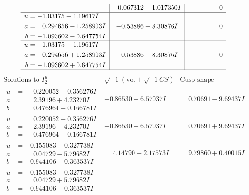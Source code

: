 \documentclass[1p]{elsarticle_modified}
\theoremstyle{definition}
\newcommand{\I}{\sqrt{-1}}
\begin{document}
$$\begin{array}{c|c|c}
 & \phantom{-}0.067312 - 1.017350 I & \phantom{-0.000000 } 0 \\ \hline\begin{aligned}
u &= -1.03175 + 1.19617 I \\
a &= \phantom{-}0.294656 - 1.258903 I \\
b &= -1.093602 - 0.647754 I\end{aligned}
 & -0.53886 + 8.30876 I & \phantom{-0.000000 } 0 \\ \hline\begin{aligned}
u &= -1.03175 - 1.19617 I \\
a &= \phantom{-}0.294656 + 1.258903 I \\
b &= -1.093602 + 0.647754 I\end{aligned}
 & -0.53886 - 8.30876 I & \phantom{-0.000000 } 0\\
 \hline 
 \end{array}$$\newpage$$\begin{array}{c|c|c}  
\text{Solutions to }I^u_{2}& \I (\text{vol} + \sqrt{-1}CS) & \text{Cusp shape}\\
 \hline 
\begin{aligned}
u &= \phantom{-}0.220052 + 0.356276 I \\
a &= \phantom{-}2.39196 + 4.23270 I \\
b &= \phantom{-}0.476964 - 0.166781 I\end{aligned}
 & -0.86530 + 6.57037 I & \phantom{-}0.70691 - 9.69437 I \\ \hline\begin{aligned}
u &= \phantom{-}0.220052 - 0.356276 I \\
a &= \phantom{-}2.39196 - 4.23270 I \\
b &= \phantom{-}0.476964 + 0.166781 I\end{aligned}
 & -0.86530 - 6.57037 I & \phantom{-}0.70691 + 9.69437 I \\ \hline\begin{aligned}
u &= -0.155083 + 0.327738 I \\
a &= \phantom{-}0.04729 - 5.79682 I \\
b &= -0.944106 - 0.363537 I\end{aligned}
 & \phantom{-}4.14790 - 2.17573 I & \phantom{-}9.79860 + 0.40015 I \\ \hline\begin{aligned}
u &= -0.155083 - 0.327738 I \\
a &= \phantom{-}0.04729 + 5.79682 I \\
b &= -0.944106 + 0.363537 I\end{aligned}

\end{array}$$
\end{document}
